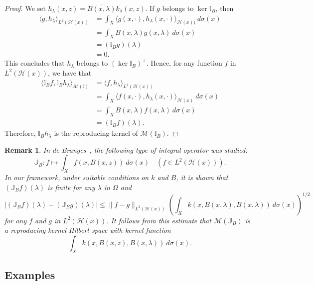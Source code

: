 \documentclass[12pt]{article}
\newtheorem{rem}[thm]{Remark}
\numberwithin{equation}{section}
\newcommand{\M}{{\mathcal M}}
\newcommand{\bI}{{\mathbb I}}
\newcommand{\bJ}{{\mathbb J}}
\newcommand{\cH}{{\mathcal H}}
\newcommand{\la}{\langle}
\newcommand{\ra}{\rangle}
\newcommand{\lam}{\lambda}
\begin{document}
\begin{proof}
We set $h_{\lam}(x,z)=\overline{B(x,\lam)}k_{\lam}(x,z)$. 
If $g$ belongs to $\ker \bI_B$, then
\begin{align*}
\la g, h_{\lam} \ra_{L^2(\cH(x))}
&=\int_{X}\la g(x,\cdot), h_{\lam}(x,\cdot) \ra_{\cH(x))}\ d\sigma(x)\\
&=\int_{X}B(x,\lam)g(x,\lam)\ d\sigma(x)\\
&=(\bI_B g)(\lam)\\
&=0. 
\end{align*}
This concludes that $h_{\lam}$ belongs to $(\ker \bI_B)^{\perp}$. 
Hence, for any function $f$ in $L^2(\cH(x))$, we have that 
\begin{align*}
\la \bI_B f, \bI_B h_{\lam} \ra_{\M(\bI)}
&=\la f,  h_{\lam}\ra_{L^2(\cH(x))}\\
&=\int_{X}\la f(x,\cdot),  h_{\lam}(x,\cdot)\ra_{\cH(x)}\ d\sigma(x)\\
&=\int_{X}B(x,\lam)f(x,\lam)\ d\sigma(x)\\
&=(\bI_B f)(\lam).
\end{align*}
Therefore, 
$\bI_B h_{\lam}$ is the reproducing kernel of $\M(\bI_B)$. 
\end{proof}


\begin{rem}\rm 

In de Branges~\cite{de Branges2}, the following type of integral operator was studied: 
\[
\bJ_B: f\mapsto \int_Xf(x,B(x,z))\ d\sigma(x)\quad (f\in L^2(\cH(x))). 
\]
In our framework, 
under suitable conditions on $k$ and $B$, 
it is shown that 
$(\bJ_Bf)(\lam)$ is finite for any $\lam$ in $\Omega$ and 
\[
|(\bJ_B f)(\lam)-(\bJ_B g)(\lam)|\leq \|f-g\|_{L^2(\cH(x))}
\left( \int_Xk(x,B(x,\lam),B(x,\lam))\ d\sigma(x)\right)^{1/2}
\]
for any $f$ and $g$ in $L^2(\cH(x))$. It follows from this estimate that 
$\M(\bJ_B)$ is a reproducing kernel Hilbert space with kernel function 
\[
\int_Xk(x,B(x,z),B(x,\lam))\ d\sigma(x). 
\]
\end{rem}


\subsection{Examples}
\end{document}
